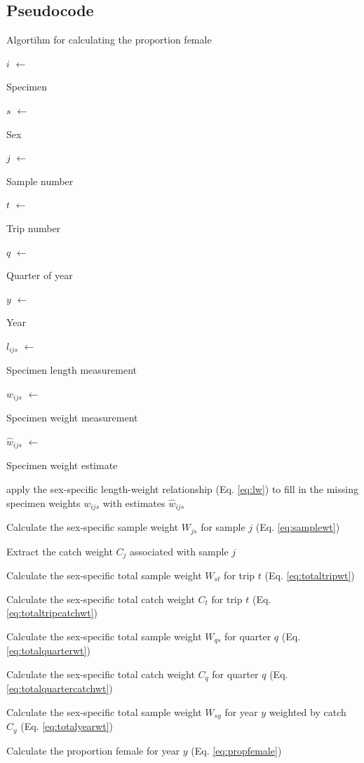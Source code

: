 \documentclass[11pt]{book}\usepackage[]{graphicx}\usepackage[]{color}
\newcommand*{\Let}[2]{\State #1 $\gets$
\parbox[t]{\linegoal}{#2\strut}}
\newcommand*{\LongState}[1]{\State
\parbox[t]{\linegoal}{#1\strut}}
\begin{document}
\subsection{Pseudocode}
\clearpage
\begin{algorithm}[h]
\caption{Algortihm for calculating the proportion female}
\begin{algorithmic}[1]
    \Let{$i$}{Specimen}
    \Let{$s$}{Sex}
    \Let{$j$}{Sample number}
    \Let{$t$}{Trip number}
    \Let{$q$}{Quarter of year}
    \Let{$y$}{Year}
    \Let{$l_{ijs}$}{Specimen length measurement}
    \Let{$w_{ijs}$}{Specimen weight measurement}
    \Let{$\hat{w}_{ijs}$}{Specimen weight estimate}
      \LongState{apply the sex-specific length-weight relationship (Eq. \ref{eq:lw}) to fill in the missing specimen weights $w_{ijs}$ with estimates $\hat{w}_{ijs}$}
    \EndFor
            \LongState{Calculate the sex-specific sample weight $W_{js}$ for sample $j$ (Eq. \ref{eq:samplewt})}
            \LongState{Extract the catch weight $C_j$ associated with sample $j$}
          \EndFor
          \LongState{Calculate the sex-specific total sample weight $W_{st}$ for trip $t$ (Eq. \ref{eq:totaltripwt})}
          \LongState{Calculate the sex-specific total catch weight $C_t$ for trip $t$ (Eq. \ref{eq:totaltripcatchwt})}
        \EndFor
        \LongState{Calculate the sex-specific total sample weight $W_{qs}$ for quarter $q$ (Eq. \ref{eq:totalquarterwt})}
        \LongState{Calculate the sex-specific total catch weight $C_q$ for quarter $q$ (Eq. \ref{eq:totalquartercatchwt})}
      \EndFor
      \LongState{Calculate the sex-specific total sample weight $W_{sy}$ for year $y$ weighted by catch $C_y$ (Eq. \ref{eq:totalyearwt})}
      \LongState{Calculate the proportion female for year $y$ (Eq. \ref{eq:propfemale})}
    \EndFor
  \EndFunction
\end{algorithmic}
\end{algorithm}
\end{document}
